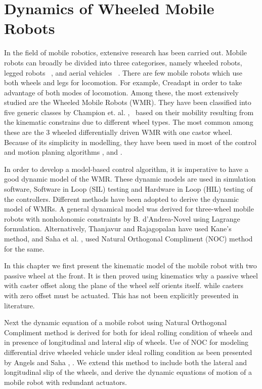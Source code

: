 \chapter{Dynamics of Wheeled Mobile Robots }
\label{c4_Dynamics}
In the field of mobile robotics, extensive research has been carried out. 
Mobile robots can broadly be divided into three categorises, namely wheeled robots, legged robots ~\cite{machado2006overview}, and aerial vehicles ~\cite{valavanis2014handbook}. 
There are few mobile robots which use both wheels and legs for locomotion. For example,  Creadapt  \cite{mouret2015evolutionary} in order to take advantage of both modes of locomotion. 
Among these, the most extensively studied are the  Wheeled Mobile Robots (WMR). 
They have been classified into five generic classes by Champion et. al. \cite{campion1996structural},~\cite{campion2008wheeled}  based on their mobility resulting from the kinematic constrains due to  different wheel types.
 The most common among these are the  3 wheeled differentially driven WMR with one castor wheel.
  Because of its simplicity in modelling, they have been used in most of the  control and motion planing algorithms  \cite{desantis1995modeling}, \cite{koh1999smooth} and \cite{d1995control}. 

In order to develop a model-based control algorithm, it is imperative to have a good dynamic model of the WMR.
 These dynamic models are used in  simulation software,  Software in Loop (SIL) testing and Hardware in Loop (HIL) testing  of the controllers.
 Different methods have  been adopted to derive the dynamic model of WMRs.
  A general dynamical model was derived for three-wheel mobile robots with nonholonomic constraints  by B. d'Andrea-Novel \cite{d1991modelling} using  Lagrange formulation.
    Alternatively, Thanjavur and Rajagopalan \cite{thanjavur1997ease} have used Kane's method,  and  Saha et al. \cite{saha1991dynamics},\cite{saha1989kinematics} used Natural Orthogonal Compliment (NOC) method for the same.  
    
In this chapter we first present the kinematic model of the mobile robot with two passive wheel at the front. It is then proved using kinematics why a passive wheel with caster offset along the plane of the wheel self orients itself. while  casters with zero offset  must be actuated.  This has not been explicitly presented in literature.

 Next the dynamic equation of a mobile robot using Natural Orthogonal Compliment method is derived for both for ideal rolling condition of wheels and in presence of longitudinal and lateral slip of wheels. Use of NOC for modeling differential drive wheeled vehicle under ideal rolling condition as been presented by Angels and Saha \cite{saha1991dynamics}, \cite{saha1989kinematics}. We extend this method to include both the lateral and longitudinal slip of the wheels, and  derive the dynamic equations of motion of a mobile robot with redundant actuators. 
 
